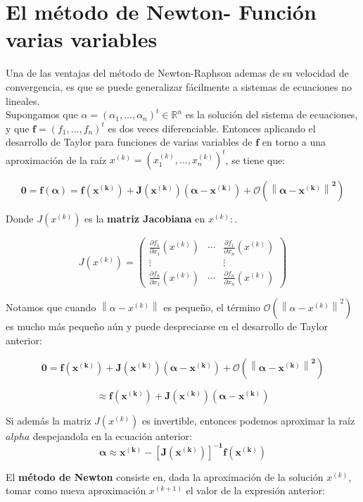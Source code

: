 \documentclass[10pt,a4paper]{article}
\begin{document}
\section{El método de Newton- Función varias variables}
Una de las ventajas del método de Newton-Raphson ademas de su velocidad de convergencia, es que se puede generalizar fácilmente a sistemas de ecuaciones no lineales.\\

Supongamos que $\alpha=(\alpha_{1},...,\alpha_{n})^{t}\in \mathbb{R}^{n}$ es la solución del sistema de ecuaciones, y que $\boldsymbol{f}=(f_{1},...,f_{n})^{t}$ es dos veces diferenciable. Entonces aplicando el desarrollo de Taylor para funciones de varias variables de $\boldsymbol{f}$ en torno a una aproximación de la raíz $x^{(k)}=(x_{1}^{(k)},...,x_{n}^{(k)})^{t}$, se tiene que: 
 
$$\boldsymbol{0=f(\alpha)=f(x^{(k)})+J(x^{(k)})(\alpha-x^{(k)})+\mathcal{O}(\left \| \alpha-x^{(k)} \right \|^{2})}$$

Donde $J(x^{(k)})$ es la  \textbf{matriz Jacobiana} en $x^{(k)}:$. 

$$J(x^{(k)})=\begin{pmatrix}
\frac{\partial f_{1}}{\partial x_{1}}(x^{(k)}) & \cdots  & \frac{\partial f_{1}}{\partial x_{n}}(x^{(k)}) \\ 
\vdots  &  & \vdots  \\ 
\frac{\partial f_{n}}{\partial x_{1}}(x^{(k)}) & \cdots & \frac{\partial f_{n}}{\partial x_{n}}(x^{(k)})
\end{pmatrix}$$

Notamos que cuando $\left \| \alpha-x^{(k)} \right \|$ es pequeño, el término $\mathcal{O}(\left \| \alpha-x^{(k)} \right \|^{2})$ es mucho más pequeño aún y puede despreciarse en el desarrollo de Taylor anterior: 

$$\boldsymbol{0=f(x^{(k)})+J(x^{(k)})(\alpha-x^{(k)})+\mathcal{O}(\left \| \alpha-x^{(k)} \right \|^{2})}$$

$$\boldsymbol{\approx f(x^{(k)})+J(x^{(k)})(\alpha-x^{(k)})}$$

Si además la matriz $J(x^{(k)})$ es invertible, entonces podemos aproximar la raíz $alpha$ despejandola en la ecuación anterior: 
  $$\boldsymbol{\alpha \approx x^{(k)}-[J(x^{(k)})]^{-1}f(x^{(k)})}$$
  
El \textbf{método de Newton} consiste en, dada la aproximación de la solución $x^{(k)}$, tomar como nueva aproximación $x^{(k+1)}$ el valor de la expresión anterior:  
\end{document}
